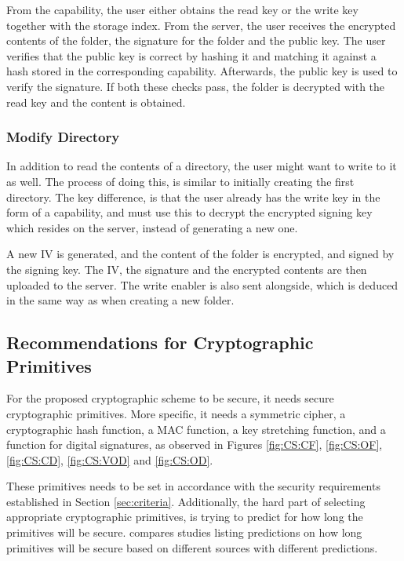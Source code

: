 \documentclass[pdftex,english,10pt,b5paper,twoside]{book}
\begin{document}
From the capability, the user either obtains the read key or the write key
together with the storage index. From the server, the user receives the
encrypted contents of the folder, the signature for the folder and the public
key. The user verifies that the public key is correct by hashing it and
matching it against a hash stored in the corresponding capability. Afterwards,
the public key is used to verify the signature. If both these checks pass, the
folder is decrypted with the read key and the content is obtained.

\subsubsection{Modify Directory}

In addition to read the contents of a directory, the user might want to write
to it as well. The process of doing this, is similar to initially creating the
first directory. The key difference, is that the user already has the write key
in the form of a capability, and must use this to decrypt the encrypted signing
key which resides on the server, instead of generating a new one.

A new \ac{IV} is generated, and the content of the folder is encrypted, and
signed by the signing key. The \ac{IV}, the signature and the encrypted
contents are then uploaded to the server. The write enabler is also sent
alongside, which is deduced in the same way as when creating a new folder.

\subsection{Recommendations for Cryptographic Primitives}
\label{sec:cryptoprimitivechoice}

For the proposed cryptographic scheme to be secure, it needs secure
cryptographic primitives. More specific, it needs a symmetric cipher, a
cryptographic hash function, a \ac{MAC} function, a key stretching function,
and a function for digital signatures, as observed in Figures \ref{fig:CS:CF},
\ref{fig:CS:OF}, \ref{fig:CS:CD}, \ref{fig:CS:VOD} and \ref{fig:CS:OD}.

These primitives needs to be set in accordance with the security requirements
established in Section \ref{sec:criteria}. Additionally, the hard part of
selecting appropriate cryptographic primitives, is trying to predict for how
long the primitives will be secure. \citet{keylength} compares studies listing
predictions on how long primitives will be secure based on different sources
with different predictions.
\end{document}
